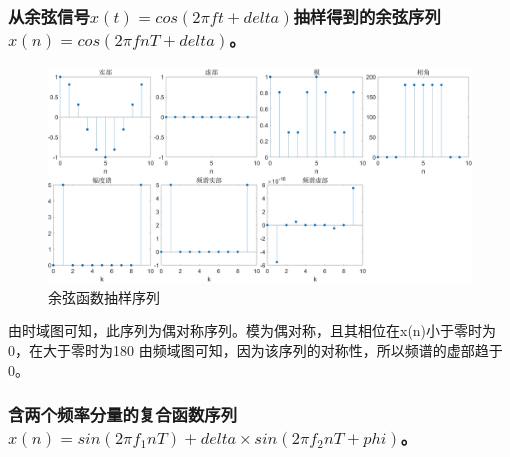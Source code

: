 \documentclass{../source/Experiment}
\begin{document}
            \subsubsection{从余弦信号$x(t)=cos(2\pi ft+delta)$抽样得到的余弦序列$x(n)=cos(2\pi fnT+delta)$。}

            \begin{figure}[H]
                \centering
                \includegraphics[width = \textwidth]{src/2_1_4.png}
                \caption{余弦函数抽样序列}
            \end{figure}

            由时域图可知，此序列为偶对称序列。模为偶对称，且其相位在x(n)小于零时为0，在大于零时为180\degree
            由频域图可知，因为该序列的对称性，所以频谱的虚部趋于 0。

            \subsubsection{含两个频率分量的复合函数序列$x(n)=sin(2\pi f_1 n T)+delta \times sin(2\pi f_2 nT+phi)$。}
\end{document}
